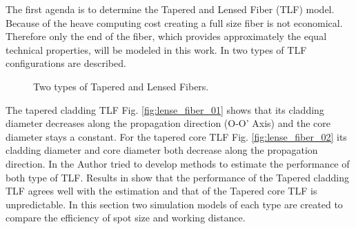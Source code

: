 The first agenda is to determine the Tapered and Lensed Fiber (TLF) model. Because of the heave computing cost creating a full size fiber is not economical. Therefore only the end of the fiber, which provides approximately the equal technical properties, will be modeled in this work. In \cite{TLF_analysis,TLF_mode_transforming} two types of TLF configurations are described.\\ 

\begin{figure}[!ht]
\centering
{}
\hfill
{}
\label{fig:two_TLF}
\caption{Two types of Tapered and Lensed Fibers.}
\end{figure}
The tapered cladding TLF Fig. \ref{fig:lense_fiber_01} shows that its cladding diameter decreases along the propagation direction (O-O' Axis) and the core diameter stays a constant. For the tapered core TLF Fig. \ref{fig:lense_fiber_02} its cladding diameter and core diameter both decrease along the propagation direction. In \cite{TLF_mode_transforming} the Author tried to develop methods to estimate the performance of both type of TLF. Results in \cite{TLF_mode_transforming} show that the performance of the Tapered cladding TLF agrees well with the estimation and that of the Tapered core TLF is unpredictable. In this section two simulation models of each type are created to compare the efficiency of spot size and working distance.\\  

